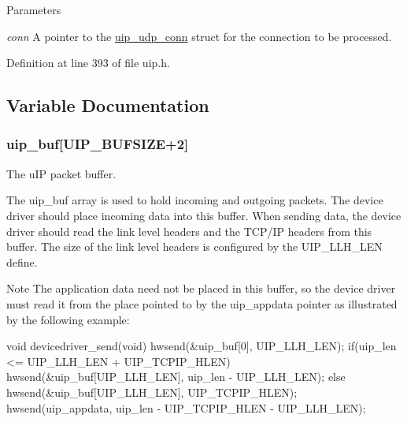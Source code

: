 \begin{DoxyParams}{Parameters}
\item[{\em conn}]A pointer to the \hyperlink{structuip__udp__conn}{uip\_\-udp\_\-conn} struct for the connection to be processed. \end{DoxyParams}


Definition at line 393 of file uip.h.



\subsection{Variable Documentation}
\hypertarget{group__uipdevfunc_gab81e78f890dbbee50c533a9734b74fd9}{
\subsubsection[{uip\_\-buf}]{ {\bf uip\_\-buf}\mbox{[}UIP\_\-BUFSIZE+2\mbox{]}}}
\label{group__uipdevfunc_gab81e78f890dbbee50c533a9734b74fd9}
The uIP packet buffer.

The uip\_\-buf array is used to hold incoming and outgoing packets. The device driver should place incoming data into this buffer. When sending data, the device driver should read the link level headers and the TCP/IP headers from this buffer. The size of the link level headers is configured by the UIP\_\-LLH\_\-LEN define.

\begin{DoxyNote}{Note}
The application data need not be placed in this buffer, so the device driver must read it from the place pointed to by the uip\_\-appdata pointer as illustrated by the following example: 
\begin{DoxyCode}
 void
 devicedriver_send(void)
 {
    hwsend(&uip_buf[0], UIP_LLH_LEN);
    if(uip_len <= UIP_LLH_LEN + UIP_TCPIP_HLEN) {
      hwsend(&uip_buf[UIP_LLH_LEN], uip_len - UIP_LLH_LEN);
    } else {
      hwsend(&uip_buf[UIP_LLH_LEN], UIP_TCPIP_HLEN);
      hwsend(uip_appdata, uip_len - UIP_TCPIP_HLEN - UIP_LLH_LEN);
    }
 }
\end{DoxyCode}
 
\end{DoxyNote}
